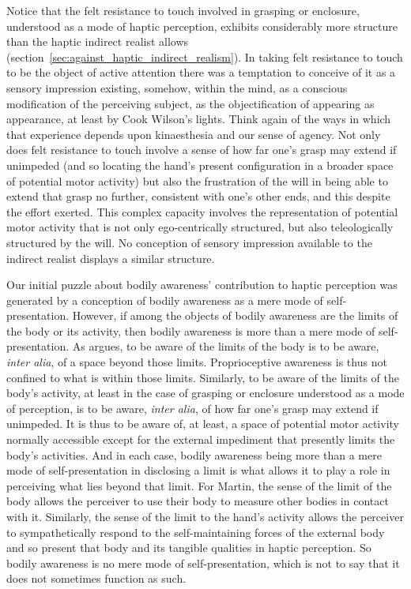 Notice that the felt resistance to touch involved in grasping or enclosure, understood as a mode of haptic perception, exhibits considerably more structure than the haptic indirect realist allows (section~\ref{sec:against_haptic_indirect_realism}). In taking felt resistance to touch to be the object of active attention there was a temptation to conceive of it as a sensory impression existing, somehow, within the mind, as a conscious modification of the perceiving subject, as the objectification of appearing as appearance, at least by Cook Wilson's lights. Think again of the ways in which that experience depends upon kinaesthesia and our sense of agency. Not only does felt resistance to touch involve a sense of how far one's grasp may extend if unimpeded (and so locating the hand's present configuration in a broader space of potential motor activity) but also the frustration of the will in being able to extend that grasp no further, consistent with one's other ends, and this despite the effort exerted. This complex capacity involves the representation of potential motor activity that is not only ego-centrically structured, but also teleologically structured by the will. No conception of sensory impression available to the indirect realist displays a similar structure.

Our initial puzzle about bodily awareness' contribution to haptic perception was generated by a conception of bodily awareness as a mere mode of self-pre\-sen\-ta\-tion. However, if among the objects of bodily awareness are the limits of the body or its activity, then bodily awareness is more than a mere mode of self-presentation. As \citet{Martin:1992aa} argues, to be aware of the limits of the body is to be aware, \emph{inter alia}, of a space beyond those limits. Proprioceptive awareness is thus not confined to what is within those limits. Similarly, to be aware of the limits of the body's activity, at least in the case of grasping or enclosure understood as a mode of perception, is to be aware, \emph{inter alia}, of how far one's grasp may extend if unimpeded. It is thus to be aware of, at least, a space of potential motor activity normally accessible except for the external impediment that presently limits the body's activities. And in each case, bodily awareness being more than a mere mode of self-presentation in disclosing a limit is what allows it to play a role in perceiving what lies beyond that limit. For Martin, the sense of the limit of the body allows the perceiver to use their body to measure other bodies in contact with it. Similarly, the sense of the limit to the hand's activity allows the perceiver to sympathetically respond to the self-maintaining forces of the external body and so present that body and its tangible qualities in haptic perception. So bodily awareness is no mere mode of self-presentation, which is not to say that it does not sometimes function as such.

